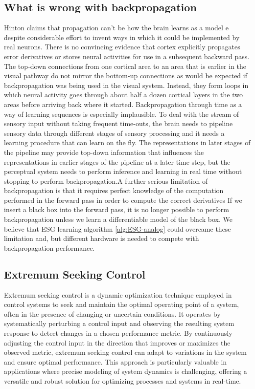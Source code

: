 \documentclass[nohyperref]{article}
\theoremstyle{plain}
\theoremstyle{definition}
\theoremstyle{remark}
\begin{document}
\subsection{What is wrong with backpropagation}
Hinton claims that propagation can't be how the brain learns as a model e despite considerable effort to
invent ways in which it could be implemented by real neurons. There is no convincing evidence
that cortex explicitly propagates error derivatives or stores neural activities for use in a subsequent
backward pass. The top-down connections from one cortical area to an area that is earlier in the
visual pathway do not mirror the bottom-up connections as would be expected if backpropagation
was being used in the visual system. Instead, they form loops in which neural activity goes through
about half a dozen cortical layers in the two areas before arriving back where it started.
Backpropagation through time as a way of learning sequences is especially implausible. To deal with
the stream of sensory input without taking frequent time-outs, the brain needs to pipeline sensory
data through different stages of sensory processing and it needs a learning procedure that can learn
on the fly. The representations in later stages of the pipeline may provide top-down information
that influences the representations in earlier stages of the pipeline at a later time step, but the
perceptual system needs to perform inference and learning in real time without stopping to perform
backpropagation.A further serious limitation of backpropagation is that it requires perfect knowledge of the computation
performed in the forward pass in order to compute the correct derivatives If we insert a black
box into the forward pass, it is no longer possible to perform backpropagation unless we learn a
differentiable model of the black box.
We believe that ESG learning algorithm \cref{alg:ESG-analog} could overcame these limitation and, but different hardware is needed to compete with backpropagation performance.   

\subsection{Extremum Seeking Control}
Extremum seeking control is a dynamic optimization technique employed in control systems to seek and maintain the optimal operating point of a system, often in the presence of changing or uncertain conditions. It operates by systematically perturbing a control input and observing the resulting system response to detect changes in a chosen performance metric. By continuously adjusting the control input in the direction that improves or maximizes the observed metric, extremum seeking control can adapt to variations in the system and ensure optimal performance. This approach is particularly valuable in applications where precise modeling of system dynamics is challenging, offering a versatile and robust solution for optimizing processes and systems in real-time.
\end{document}
